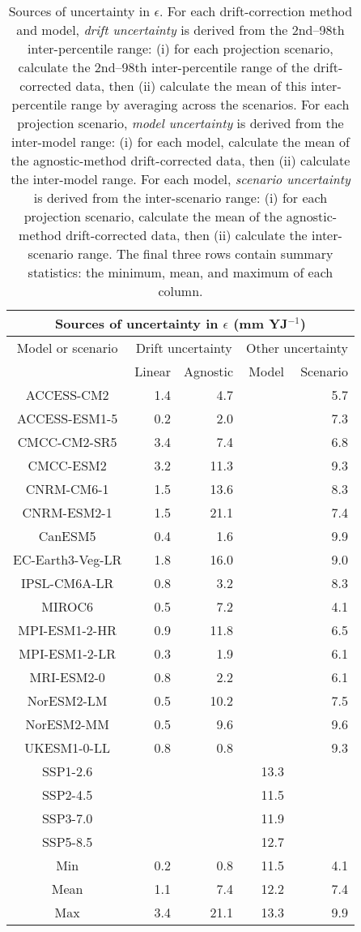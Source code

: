 \begin{table*}[t]
\centering
\caption{Sources of uncertainty in $\epsilon$. For each drift-correction method and model, \emph{drift uncertainty} is derived from the 2nd--98th inter-percentile range: (i) for each projection scenario, calculate the 2nd--98th inter-percentile range of the drift-corrected data, then (ii) calculate the mean of this inter-percentile range by averaging across the scenarios. For each projection scenario, \emph{model uncertainty} is derived from the inter-model range: (i) for each model, calculate the mean of the agnostic-method drift-corrected data, then (ii) calculate the inter-model range. For each model, \emph{scenario uncertainty} is derived from the inter-scenario range: (i) for each projection scenario, calculate the mean of the agnostic-method drift-corrected data, then (ii) calculate the inter-scenario range. The final three rows contain summary statistics: the minimum, mean, and maximum of each column.}
\begin{tabular}{c|rr|rr}
\toprule
\multicolumn{5}{c}{Sources of uncertainty in $\epsilon$ (mm YJ$^{-1}$)} \\ 
\midrule
Model or scenario & \multicolumn{2}{c|}{Drift uncertainty} & \multicolumn{2}{c}{Other uncertainty} \\
 & Linear & Agnostic & Model & Scenario \\
\midrule
ACCESS-CM2 & 1.4 & 4.7 &  & 5.7 \\
ACCESS-ESM1-5 & 0.2 & 2.0 &  & 7.3 \\
CMCC-CM2-SR5 & 3.4 & 7.4 &  & 6.8 \\
CMCC-ESM2 & 3.2 & 11.3 &  & 9.3 \\
CNRM-CM6-1 & 1.5 & 13.6 &  & 8.3 \\
CNRM-ESM2-1 & 1.5 & 21.1 &  & 7.4 \\
CanESM5 & 0.4 & 1.6 &  & 9.9 \\
EC-Earth3-Veg-LR & 1.8 & 16.0 &  & 9.0 \\
IPSL-CM6A-LR & 0.8 & 3.2 &  & 8.3 \\
MIROC6 & 0.5 & 7.2 &  & 4.1 \\
MPI-ESM1-2-HR & 0.9 & 11.8 &  & 6.5 \\
MPI-ESM1-2-LR & 0.3 & 1.9 &  & 6.1 \\
MRI-ESM2-0 & 0.8 & 2.2 &  & 6.1 \\
NorESM2-LM & 0.5 & 10.2 &  & 7.5 \\
NorESM2-MM & 0.5 & 9.6 &  & 9.6 \\
UKESM1-0-LL & 0.8 & 0.8 &  & 9.3 \\
SSP1-2.6 &  &  & 13.3 &  \\
SSP2-4.5 &  &  & 11.5 &  \\
SSP3-7.0 &  &  & 11.9 &  \\
SSP5-8.5 &  &  & 12.7 &  \\
\midrule
Min & 0.2 & 0.8 & 11.5 & 4.1 \\
Mean & 1.1 & 7.4 & 12.2 & 7.4 \\
Max & 3.4 & 21.1 & 13.3 & 9.9 \\
\bottomrule
\end{tabular}
\end{table*}
